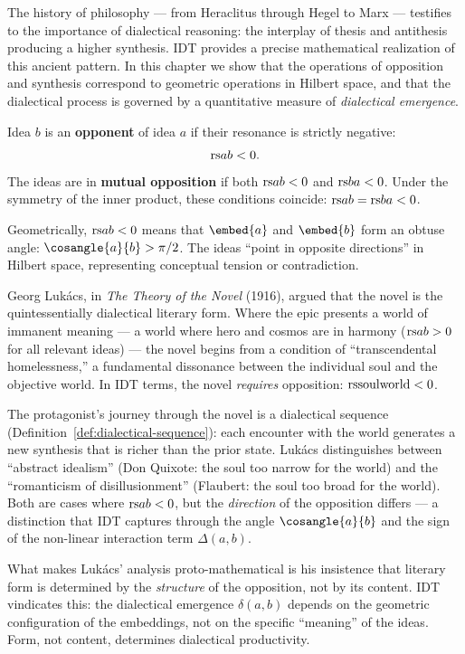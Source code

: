 The history of philosophy --- from Heraclitus through Hegel to Marx --- testifies
to the importance of dialectical reasoning: the interplay of thesis and
antithesis producing a higher synthesis.  IDT provides a precise mathematical
realization of this ancient pattern.  In this chapter we show that the
operations of opposition and synthesis correspond to geometric operations in
Hilbert space, and that the dialectical process is governed by a quantitative
measure of \emph{dialectical emergence}.

\begin{definition}[Opposition]
\label{def:opposition}
Idea $b$ is an \textbf{opponent} of idea $a$ if their resonance is strictly
negative:
\[
  \mathrm{rs}{a}{b} < 0.
\]
The ideas are in \textbf{mutual opposition} if both $\mathrm{rs}{a}{b} < 0$ and
$\mathrm{rs}{b}{a} < 0$.  Under the symmetry of the inner product, these conditions
coincide: $\mathrm{rs}{a}{b} = \mathrm{rs}{b}{a} < 0$.
\end{definition}

\begin{remark}
Geometrically, $\mathrm{rs}{a}{b} < 0$ means that $\embed{a}$ and $\embed{b}$ form an
obtuse angle: $\cosangle{a}{b} > \pi/2$.  The ideas ``point in opposite
directions'' in Hilbert space, representing conceptual tension or
contradiction.
\end{remark}

\begin{interpretation}
\label{interp:ch16:lukacs_novel}
Georg Luk\'acs, in \textit{The Theory of the Novel} (1916), argued that the
novel is the quintessentially dialectical literary form.  Where the epic
presents a world of immanent meaning --- a world where hero and cosmos are
in harmony ($\mathrm{rs}{a}{b} > 0$ for all relevant ideas) --- the novel begins from
a condition of ``transcendental homelessness,'' a fundamental dissonance
between the individual soul and the objective world.  In IDT terms, the novel
\emph{requires} opposition: $\mathrm{rs}{\text{soul}}{\text{world}} < 0$.

The protagonist's journey through the novel is a dialectical sequence
(Definition~\ref{def:dialectical-sequence}): each encounter with the world
generates a new synthesis that is richer than the prior state.  Luk\'acs
distinguishes between ``abstract idealism'' (Don Quixote: the soul too
narrow for the world) and the ``romanticism of disillusionment'' (Flaubert:
the soul too broad for the world).  Both are cases where $\mathrm{rs}{a}{b} < 0$,
but the \emph{direction} of the opposition differs --- a distinction that
IDT captures through the angle $\cosangle{a}{b}$ and the sign of the
non-linear interaction term $\Delta(a,b)$.

What makes Luk\'acs' analysis proto-mathematical is his insistence that
literary form is determined by the \emph{structure} of the opposition, not
by its content.  IDT vindicates this: the dialectical emergence
$\delta(a,b)$ depends on the geometric configuration of the embeddings,
not on the specific ``meaning'' of the ideas.  Form, not content,
determines dialectical productivity.
\end{interpretation}


